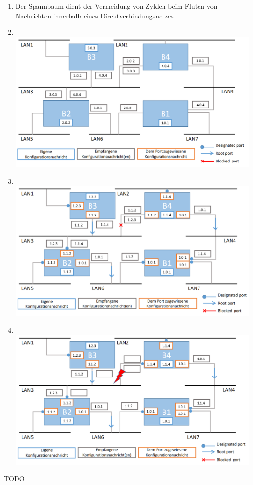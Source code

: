 \documentclass[12pt]{scrartcl}
\begin{document}
\setcounter{exnum}{1}
    \begin{enumerate}[label=(\alph*)]
        \item   Der Spannbaum dient der Vermeidung von Zyklen beim Fluten von Nachrichten innerhalb eines Direktverbindungsnetzes.
        \item  \ \\ \includegraphics[width = 0.9 \textwidth]{grafiken/1b.png}
        \item  \ \\  \includegraphics[width = 0.9 \textwidth]{grafiken/1c.png}
        \newpage
        \item  \ \\ \includegraphics[width = 0.9 \textwidth]{grafiken/1d.png}
    \end{enumerate}
 
\setcounter{exnum}{2}
    TODO


\end{document}
